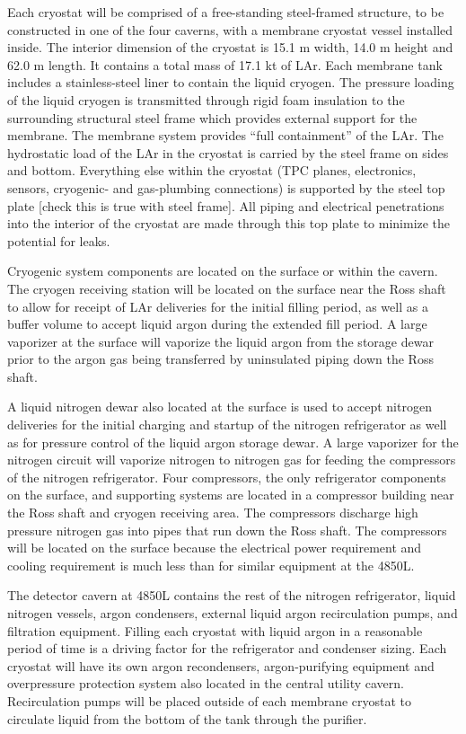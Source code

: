 Each cryostat will be comprised of a free-standing steel-framed structure, to be constructed in one of the four caverns, with a membrane cryostat vessel installed inside. The interior dimension of the cryostat is 15.1 m width, 14.0 m height and 62.0 m length. It contains a total mass of 17.1 kt of LAr. Each membrane tank includes a stainless-steel liner to contain the liquid cryogen. The pressure loading of the liquid cryogen is transmitted through rigid foam insulation to the surrounding structural steel frame which provides external support for the membrane. The membrane system provides “full containment” of the LAr. The hydrostatic load of the LAr in the cryostat is carried by the steel frame on sides and bottom. Everything else within the cryostat (TPC planes, electronics, sensors, cryogenic- and gas-plumbing connections) is supported by the steel top plate [check this is true with steel frame]. All piping and electrical penetrations into the interior of the cryostat are made through this top plate to minimize the potential for leaks.

Cryogenic system components are located on the surface or within the cavern. The cryogen receiving station will be located on the surface near the Ross shaft to allow for receipt of LAr deliveries for the initial filling period, as well as a buffer volume to accept liquid argon during the extended fill period. A large vaporizer at the surface will vaporize the liquid argon from the storage dewar prior to the argon gas being transferred by uninsulated piping down the Ross shaft. 

A liquid nitrogen dewar also located at the surface is used to accept nitrogen deliveries for the initial charging and startup of the nitrogen refrigerator as well as for pressure control of the liquid argon storage dewar. A large vaporizer for the nitrogen circuit will vaporize nitrogen to nitrogen gas for feeding the compressors of the nitrogen refrigerator. Four compressors, the only refrigerator components on the surface, and supporting systems are located in a compressor building near the Ross shaft and cryogen receiving area. The compressors discharge high pressure nitrogen gas into pipes that run down the Ross shaft. The compressors will be located on the surface because the electrical power requirement and cooling requirement is much less than for similar equipment at the 4850L.  

The detector cavern at 4850L contains the rest of the nitrogen refrigerator, liquid nitrogen vessels, argon condensers, external liquid argon recirculation pumps, and filtration equipment. Filling each cryostat with liquid argon in a reasonable period of time is a driving factor for the refrigerator and condenser sizing.  Each cryostat will have its own argon recondensers, argon-purifying equipment and overpressure protection system also located in the central utility cavern. Recirculation pumps will be placed outside of each membrane cryostat to circulate liquid from the bottom of the tank through the purifier.






